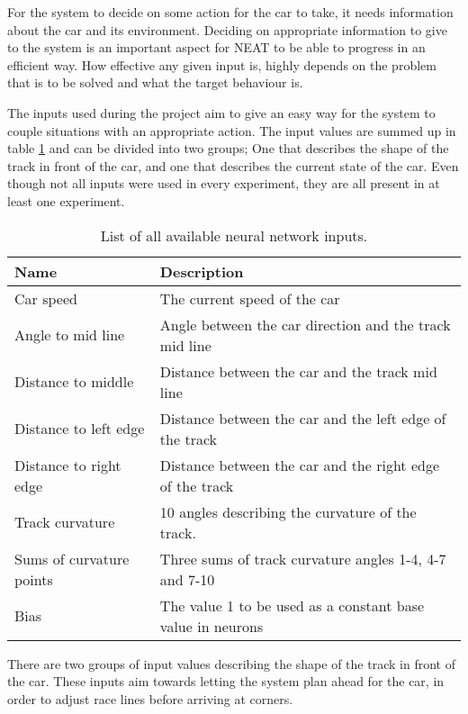For the system to decide on some action for the car to take, it needs information about the car and its environment. Deciding on appropriate information to give to the system is an important aspect for NEAT to be able to progress in an efficient way. How effective any given input is, highly depends on the problem that is to be solved and what the target behaviour is.

The inputs used during the project aim to give an easy way for the system to couple situations with an appropriate action. The input values are summed up in table \ref{tab:input_table} and can be divided into two groups; One that describes the shape of the track in front of the car, and one that describes the current state of the car. Even though not all inputs were used in every experiment, they are all present in at least one experiment.

\begin{table}[h!] 
  \centering
  \begin{tabular}{ll}
    \toprule
    Name & Description\\
    \midrule
    Car speed  & The current speed of the car\\
    Angle to mid line & Angle between the car direction and the  track mid line\\
    Distance to middle & Distance between the car and the track mid line\\
    Distance to left edge & Distance between the car and the left edge of the track\\
    Distance to right edge & Distance between the car and the right edge of the track\\
    Track curvature & 10 angles describing the curvature of the track. \\
    Sums of curvature points & Three sums of track curvature angles 1-4, 4-7 and 7-10\\
    Bias & The value 1 to be used as a constant base value in neurons\\
    \bottomrule
  \end{tabular}
  \caption{List of all available neural network inputs.}
  \label{tab:input_table}
\end{table}

\noindent

There are two groups of input values describing the shape of the track in front of the car. These inputs aim towards letting the system plan ahead for the car, in order to adjust race lines before arriving at corners. 

